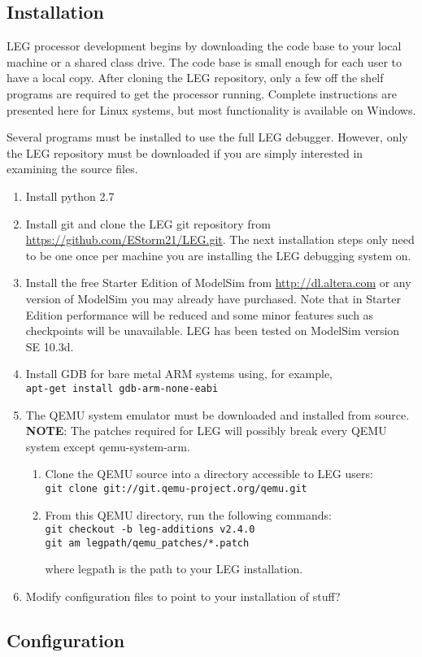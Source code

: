 \subsection{Installation}
LEG processor development begins by downloading the code base to your local machine or a shared class drive.
The code base is small enough for each user to have a local copy.
After cloning the LEG repository, only a few off the shelf programs are required to get the processor running.
Complete instructions are presented here for Linux systems, but most functionality is available on Windows.

Several programs must be installed to use the full LEG debugger. 
However, only the LEG repository must be downloaded if you are simply interested in examining the source files.

\begin{enumerate}
\item Install python 2.7
\item Install git and clone the LEG git repository from \url{https://github.com/EStorm21/LEG.git}. The next installation steps only need to be one once per machine you are installing the LEG debugging system on.
\item Install the free Starter Edition of ModelSim from \url{http://dl.altera.com} or any version of ModelSim you may already have purchased. 
Note that in Starter Edition performance will be reduced and some minor features such as checkpoints will be unavailable. 
LEG has been tested on ModelSim version SE 10.3d. 
\item Install GDB for bare metal ARM systems using, for example, \\\texttt{apt-get install gdb-arm-none-eabi}
\item The QEMU system emulator must be downloaded and installed from source. 
\textbf{NOTE}: The patches required for LEG will possibly break every QEMU system except qemu-system-arm. 
	\begin{enumerate}
	\item Clone the QEMU source into a directory accessible to LEG users: \\\texttt{git clone git://git.qemu-project.org/qemu.git}
	\item From this QEMU directory, run the following commands: \\\texttt{git checkout -b leg-additions v2.4.0 \\ git am legpath/qemu\_patches/*.patch}
	
	where legpath is the path to your LEG installation.
	\end{enumerate}
\item Modify configuration files to point to your installation of stuff?
\end{enumerate}

\subsection{Configuration}
